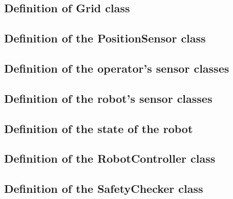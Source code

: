 \documentclass[a4paper]{article}
\begin{document}
\subsection{Definition of Grid class}


\pagebreak
\subsection{Definition of the PositionSensor class}


\pagebreak
\subsection{Definition of the operator's sensor classes}


\pagebreak



\pagebreak
\subsection{Definition of the robot's sensor classes}


\pagebreak


\pagebreak
\subsection{Definition of the state of the robot}


\pagebreak
\subsection{Definition of the RobotController class}


\pagebreak
\subsection{Definition of the SafetyChecker class}



% 
\end{document}
